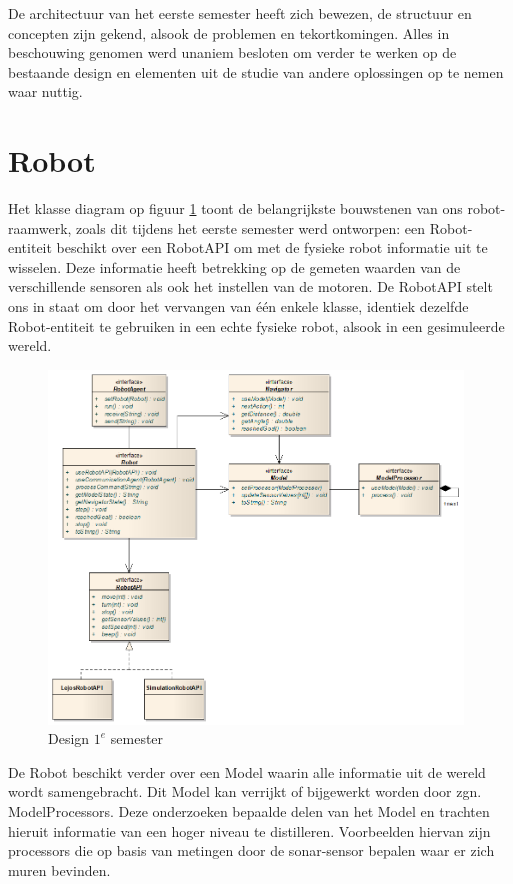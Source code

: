\documentclass[12pt,a4paper]{report}
\begin{document}
De architectuur van het eerste semester heeft zich bewezen, de structuur en concepten zijn gekend, alsook de problemen en tekortkomingen. Alles in beschouwing genomen werd unaniem besloten om verder te werken op de bestaande design en elementen uit de studie van andere oplossingen op te nemen waar nuttig.

\section{Robot}

Het klasse diagram op figuur \ref{uml:design-semester1} toont de belangrijkste bouwstenen van ons robot-raamwerk, zoals dit tijdens het eerste semester werd ontworpen: een Robot-entiteit beschikt over een RobotAPI om met de fysieke robot informatie uit te wisselen. Deze informatie heeft betrekking op de gemeten waarden van de verschillende sensoren als ook het instellen van de motoren. De RobotAPI stelt ons in staat om door het vervangen van \'e\'en enkele klasse, identiek dezelfde Robot-entiteit te gebruiken in een echte fysieke robot, alsook in een gesimuleerde wereld.

\begin{figure}[htbp]
  \centering
  \includegraphics[width=110mm]{resources/design-semester1.png}
  \caption{Design $1^e$ semester}
  \label{uml:design-semester1}
\end{figure}

De Robot beschikt verder over een Model waarin alle informatie uit de wereld wordt samengebracht. Dit Model kan verrijkt of bijgewerkt worden door zgn. ModelProcessors. Deze onderzoeken bepaalde delen van het Model en trachten hieruit informatie van een hoger niveau te distilleren. Voorbeelden hiervan zijn processors die op basis van metingen door de sonar-sensor bepalen waar er zich muren bevinden.
\end{document}
